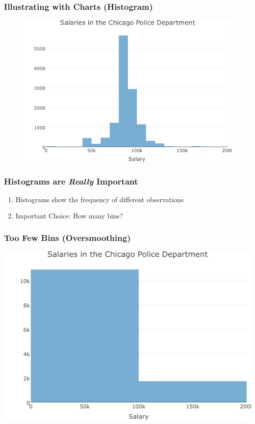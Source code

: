 \documentclass[handout]{beamer}
\begin{document}
\begin{frame}
\frametitle{Illustrating with Charts (Histogram)}
	\begin{figure}
		\includegraphics[scale = 0.5]{./images/chicagoHistogram.png}
	\end{figure}
\end{frame}

\begin{frame}
\frametitle{Histograms are \emph{Really} Important}
	\begin{enumerate}
		\item Histograms show the frequency of different observations
		\item \alert{Important Choice:} How many bins?
	\end{enumerate}
\end{frame}

\begin{frame}
\frametitle{Too Few Bins (Oversmoothing)}
	\includegraphics[width = \textwidth]{./images/histogramFew.png}
\end{frame}
\end{document}

